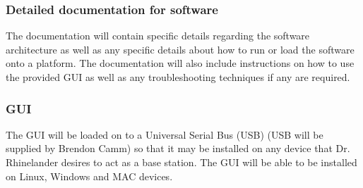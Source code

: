 \subsubsection{Detailed documentation for software}
The documentation will contain specific details regarding the software architecture as well as any specific details about how to run or load the software onto a platform. The documentation will also include instructions  on how to use the provided GUI as well as any troubleshooting techniques if any are required.  
\subsubsection{GUI}
The GUI will be loaded on to a Universal Serial Bus (USB) (USB will be supplied by Brendon Camm) so that it may be installed on any device that Dr. Rhinelander  desires to act as a base station. The GUI will be able to be installed on Linux, Windows and MAC devices.


 



	
